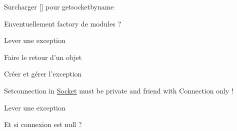 
\begin{DoxyRefList}
\item[\label{todo__todo000002}%
\hypertarget{todo__todo000002}{}%
Membre \hyperlink{classBatteryModule_a2fb494ef5f124c38c0fdf9ccfb31918f}{Battery\-Module\-:\-:Battery\-Module} (std\-::string name, Params params=Params())]Surcharger \mbox{[}\mbox{]} pour getsocketbyname  
\item[\label{todo__todo000004}%
\hypertarget{todo__todo000004}{}%
Classe \hyperlink{classISynchronized}{I\-Synchronized} ]Enventuellement factory de modules ?  
\item[\label{todo__todo000005}%
\hypertarget{todo__todo000005}{}%
Membre \hyperlink{classModule_ab7ea9648fa500696c85e93ebd0666390}{Module\-:\-:clock} (int)]Lever une exception  
\item[\label{todo__todo000006}%
\hypertarget{todo__todo000006}{}%
Membre \hyperlink{classModule_aed844ffed911793d3895c5a2bc4f9d43}{Module\-:\-:get\-Socket\-By\-Name} (std\-::string)]Faire le retour d'un objet 

Créer et gérer l'exception  
\item[\label{todo__todo000011}%
\hypertarget{todo__todo000011}{}%
Classe \hyperlink{classSocket}{Socket} ]Setconnection in \hyperlink{classSocket}{Socket} must be private and friend with Connection only !  
\item[\label{todo__todo000010}%
\hypertarget{todo__todo000010}{}%
Membre \hyperlink{classSocket_a71e162a0ca00b1a46fe23eaccb09f76d}{Socket\-:\-:get\-First\-Message} ()]Lever une exception  
\item[\label{todo__todo000009}%
\hypertarget{todo__todo000009}{}%
Membre \hyperlink{classSocket_a06b687baf9b01f3e399a5ee040ca04e4}{Socket\-:\-:send} (std\-::shared\-\_\-ptr$<$ Message $>$)]Et si connexion est null ? 
\end{DoxyRefList}
